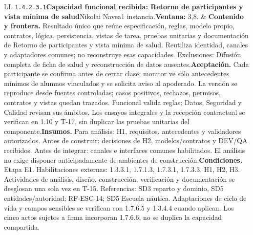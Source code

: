 \begin{longtable}{L{\tabcolsep\relax}L{\tabcolsep\relax}}
\texttt{1.\allowbreak{}4.\allowbreak{}2.\allowbreak{}3.\allowbreak{}1}\newline{}\textbf{Capacidad funcional recibida: Retorno de participantes y vista mínima de salud}\newline{}Nikolai Navea\newline{}1 instancia.\newline{}\textbf{Ventana:} 3,8. & \textbf{Contenido y frontera.} Resultado único que reúne especificación, reglas, modelo propio, contratos, lógica, persistencia, vistas de tarea, pruebas unitarias y documentación de Retorno de participantes y vista mínima de salud. Reutiliza identidad, canales y adaptadores comunes; no reconstruye esas capacidades. Exclusiones: Difusión completa de ficha de salud y reconstrucción de datos ausentes.\newline{}\textbf{Aceptación.} Cada participante se confirma antes de cerrar clase; monitor ve sólo antecedentes mínimos de alumnos vinculados y se solicita aviso al apoderado. La versión se reproduce desde fuentes controladas; casos positivos, rechazos, permisos, contratos y vistas quedan trazados. Funcional valida reglas; Datos, Seguridad y Calidad revisan sus ámbitos. Los ensayos integrales y la recepción contractual se verifican en 1.10 y T-17, sin duplicar las pruebas unitarias del componente.\newline{}\textbf{Insumos.} Para análisis: H1, requisitos, antecedentes y validadores autorizados. Antes de construir: decisiones de H2, modelos/contratos y DEV/QA recibidos. Antes de integrar: canales e interfaces comunes habilitados. El análisis no exige disponer anticipadamente de ambientes de construcción.\newline{}\textbf{Condiciones.} Etapa E1. Habilitaciones externas: 1.3.3.1, 1.7.1.3, 1.7.3.1, 1.7.3.3, H1, H2, H3. Actividades de análisis, diseño, construcción, verificación y documentación se desglosan una sola vez en T-15. Referencias: SD3 reparto y dominio, SD5 entidades/autoridad; RF-ESC-14; SD5 Escuela náutica. Adaptaciones de ciclo de vida y campos sensibles se verifican con 1.7.6.5 y 1.3.4.4 cuando aplican. Los cinco actos sujetos a firma incorporan 1.7.6.6; no se duplica la capacidad compartida.\\\hline

\end{longtable}
